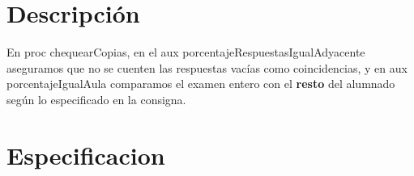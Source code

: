 \documentclass[11pt,a4paper]{article}
\begin{document}
\maketitle

\section{Descripción}

En proc chequearCopias, en el aux porcentajeRespuestasIgualAdyacente aseguramos que no se cuenten las respuestas vacías como coincidencias, y en aux porcentajeIgualAula comparamos el examen entero con el \textbf{resto} del alumnado según lo especificado en la consigna.

\section{Especificacion}
\end{document}
